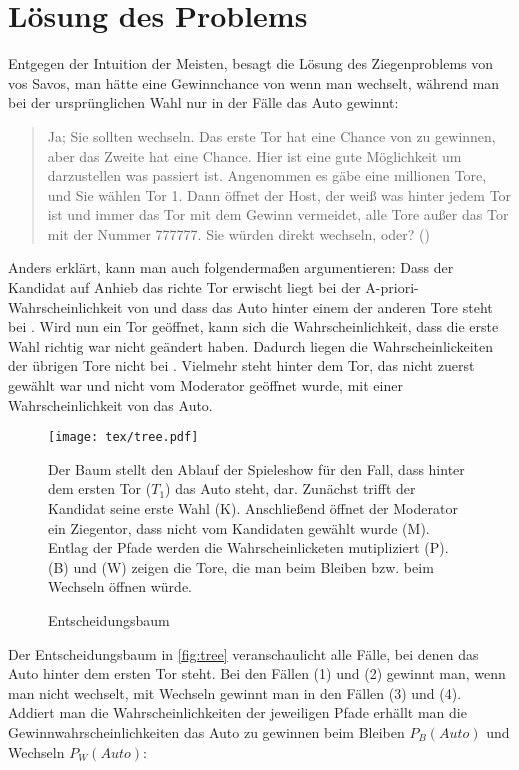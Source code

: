 \chapter{Lösung des Problems}

Entgegen der Intuition der Meisten, besagt die Lösung des Ziegenproblems von vos Savos, man hätte eine Gewinnchance von  wenn man wechselt, während man bei der ursprünglichen Wahl nur in  der Fälle das Auto gewinnt:

\begin{quote}
    Ja; Sie sollten wechseln. Das erste Tor hat eine Chance von  zu gewinnen, aber das Zweite hat eine  Chance. Hier ist eine gute Möglichkeit um darzustellen was passiert ist. Angenommen es gäbe eine millionen Tore, und Sie wählen Tor 1. Dann öffnet der Host, der weiß was hinter jedem Tor ist und immer das Tor mit dem Gewinn vermeidet, alle Tore außer das Tor mit der Nummer 777777. Sie würden direkt wechseln, oder? (\cite{Savant:1990})
\end{quote}

Anders erklärt, kann man auch folgendermaßen argumentieren: Dass der Kandidat auf Anhieb das richte Tor erwischt liegt bei der A-priori-Wahrscheinlichkeit von  und dass das Auto hinter einem der anderen Tore steht bei . Wird nun ein Tor geöffnet, kann sich die Wahrscheinlichkeit, dass die erste Wahl richtig war nicht geändert haben. Dadurch liegen die Wahrscheinlickeiten der übrigen Tore nicht bei . Vielmehr steht hinter dem Tor, das nicht zuerst gewählt war und nicht vom Moderator geöffnet wurde, mit einer Wahrscheinlichkeit von  das Auto.

\begin{figure}[htbp]
    \centering
    \texttt{[image: tex/tree.pdf]}
    \caption{Entscheidungsbaum}\label{fig:tree}
    \small {Der Baum stellt den Ablauf der Spieleshow für den Fall, dass hinter dem ersten Tor ($T_1$) das Auto steht, dar. Zunächst trifft der Kandidat seine erste Wahl (K). Anschließend öffnet der Moderator ein Ziegentor, dass nicht vom Kandidaten gewählt wurde (M). Entlag der Pfade werden die Wahrscheinlicketen mutipliziert (P). (B) und (W) zeigen die Tore, die man beim Bleiben bzw. beim Wechseln öffnen würde.}
\end{figure}

Der Entscheidungsbaum in \autoref{fig:tree} veranschaulicht alle Fälle, bei denen das Auto hinter dem ersten Tor steht. Bei den Fällen (1) und (2) gewinnt man, wenn man nicht wechselt, mit Wechseln gewinnt man in den Fällen (3) und (4). Addiert man die Wahrscheinlichkeiten der jeweiligen Pfade erhällt man die Gewinnwahrscheinlichkeiten das Auto zu gewinnen beim Bleiben $P_B(Auto)$ und Wechseln $P_W(Auto)$:

